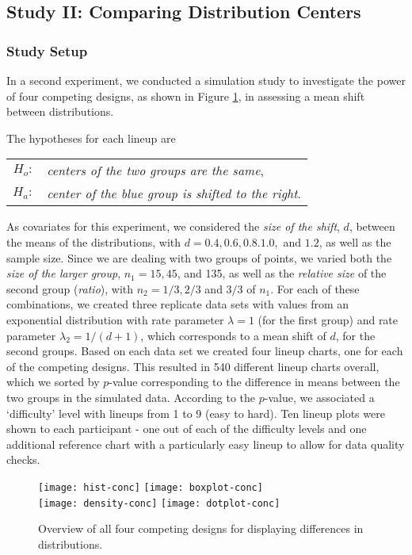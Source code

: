 \subsection{Study II: Comparing Distribution Centers}
\subsubsection{Study Setup}
In a second experiment, we conducted a simulation study to investigate the power of four competing designs, as shown in Figure \ref{fig:expii}, in assessing a mean shift between distributions. 

\noindent The  hypotheses for each lineup are

\begin{tabular}{rl}
$H_o:$&{\em centers of the two groups are the same}, \\
$H_a:$&{\em center of the blue group is shifted to the right}.\\[3pt]
\end{tabular}

As covariates for this experiment, we considered the {\it size of the shift}, $d$, between the means of the distributions, with $d=0.4, 0.6, 0.8. 1.0,$ and $1.2$, as well as the sample size.  Since we are dealing with two groups of points, we varied both the {\em size of the larger group}, $n_1 = 15, 45$, and 135, as well as the {\em relative size} of the second group ({\em ratio}), with $n_2 = 1/3, 2/3$ and $3/3$ of $n_1$. 
For each of these combinations, we created three replicate data sets with values from an exponential distribution with rate parameter $\lambda=1$ (for the first group) and rate parameter $\lambda_2=1/(d+1)$, which corresponds to a mean shift of $d$, for the second groups. 
Based on each data set we created four lineup charts, one for each of the competing designs. This resulted in 540 different lineup charts overall, which we sorted by $p$-value corresponding to the difference in means between the two groups in the simulated data. According to the $p$-value, we associated a `difficulty' level with lineups from 1 to 9 (easy to hard). Ten lineup plots were shown to each participant - one out of each of the difficulty levels and one additional reference chart with a particularly easy lineup  to allow for data quality checks.
\begin{figure} [hbtp]
   \centering
   \texttt{[image: hist-conc]} 
   \texttt{[image: boxplot-conc]} \\
   \texttt{[image: density-conc]} 
   \texttt{[image: dotplot-conc]} 
\vspace{-0.1in}
   \caption{Overview of all four competing designs for displaying differences in distributions.}
   \label{fig:expii}
\end{figure}

